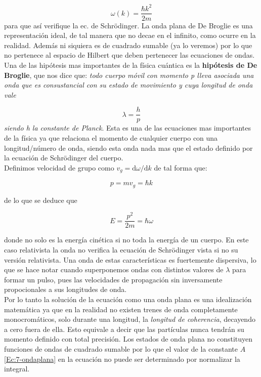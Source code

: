 \documentclass[12pt,a4paper]{article}
\numberwithin{equation}{section}
\numberwithin{figure}{section}
\newcommand{\D}{\mathrm{d}}
\begin{document}
\begin{equation}
\omega (k) = \dfrac{\hbar k^2}{2 m}
\end{equation}
para que así verifique la ec. de Schrödinger. La onda plana de De Broglie es una representación ideal, de tal manera que no decae en el infinito, como ocurre en la realidad. Además ni siquiera es de cuadrado sumable (ya lo veremos) por lo que no pertenece al espacio de Hilbert que deben pertenecer las ecuaciones de ondas. Una de las hipótesis mas importantes de la física cuántica es la \textbf{hipótesis de De Broglie}, que nos dice que: \textit{todo cuerpo móvil con momento p lleva asociada una onda que es consustancial con su estado de movimiento y cuya longitud de onda vale}

\begin{equation}
\lambda = \dfrac{h}{p}
\end{equation}
\textit{siendo h la constante de Planck}. Esta es una de las ecuaciones mas importantes de la física ya que relaciona el momento de cualquier cuerpo con una longitud/número de onda, siendo esta onda nada mas que el estado definido por la ecuación de Schrödinger del cuerpo. \\


Definimos velocidad de grupo como $ v_g = \D \omega / \D k$ de tal forma que:

\begin{equation}
p = m v_g = \hbar k
\end{equation}

de lo que se deduce que

\begin{equation}
E = \dfrac{p^2}{2m} = \hbar \omega
\end{equation}

donde no solo es la energía cinética si no toda la energía de un cuerpo. En este caso relativista la onda no verifica la ecuación de Schrödinger vista si no su versión relativista. Una onda de estas características es fuertemente dispersiva, lo que se hace notar cuando superponemos ondas con distintos valores de $\lambda$ para formar un pulso, pues las velocidades de propagación sin inversamente propocionales a sus longitudes de onda. \\

Por lo tanto la solución de la ecuación como una onda plana es una idealización matemática ya que en la realidad no existen trenes de onda completamente monocromáticos, solo durante una longitud, la \textit{longitud de coherencia}, decayendo a cero fuera de ella. Esto equivale a decir que las partículas nunca tendrán su momento definido con total precisión. Los estados de onda plana no constituyen funciones de ondas de cuadrado sumable por lo que el valor de la constante $A$ \ref{Ec:7-ondaplana} en la ecuación no puede ser determinado por normalizar la integral. \\
\end{document}
